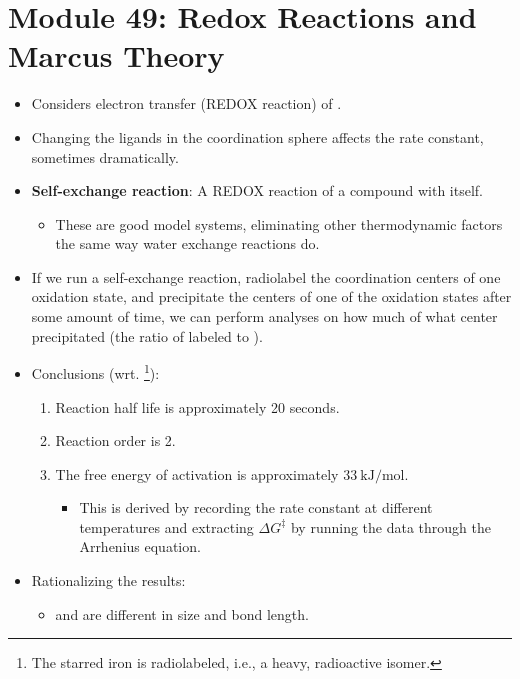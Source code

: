 \documentclass[../notes.tex]{subfiles}
\begin{document}
\section{Module 49: Redox Reactions and Marcus Theory}
\begin{itemize}
    \item {}Considers electron transfer (REDOX reaction) of .
    \item Changing the ligands in the coordination sphere affects the rate constant, sometimes dramatically.
    \item \textbf{Self-exchange reaction}: A REDOX reaction of a compound with itself.
    \begin{itemize}
        \item These are good model systems, eliminating other thermodynamic factors the same way water exchange reactions do.
    \end{itemize}
    \item If we run a self-exchange reaction, radiolabel the coordination centers of one oxidation state, and precipitate the centers of one of the oxidation states after some amount of time, we can perform analyses on how much of what center precipitated (the ratio of labeled  to ).
    \item Conclusions (wrt. \footnote{The starred iron is radiolabeled, i.e., a heavy, radioactive isomer.}):
    \begin{enumerate}
        \item Reaction half life is approximately 20 seconds.
        \item Reaction order is 2.
        \item The free energy of activation is approximately $\SI{33}{\kilo\joule\per\mole}$.
        \begin{itemize}
            \item This is derived by recording the rate constant at different temperatures and extracting $\Delta G^\ddagger$ by running the data through the Arrhenius equation.
        \end{itemize}
    \end{enumerate}
    \item Rationalizing the results:
    \begin{itemize}
        \item {} and  are different in size and bond length.

\end{itemize}
\end{itemize}
\end{document}
